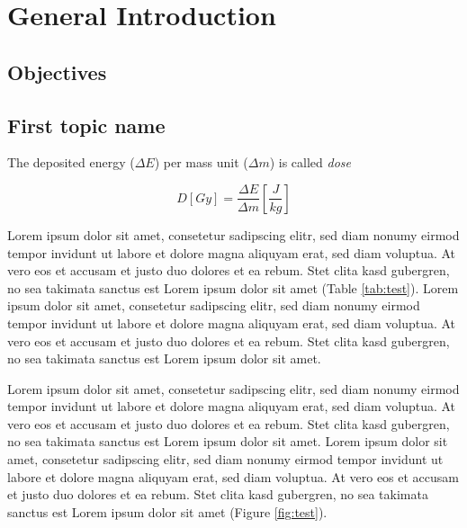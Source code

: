 \chapter{General Introduction} \label{introduction}
\setcounter{page}{1}

\section{Objectives}

\section{First topic name}

The deposited energy ($\Delta E$) per mass unit ($\Delta m$) is called \textit{dose}

\begin{equation}
D[Gy]=\frac{\Delta E}{\Delta m} \left [ \frac{J}{kg} \right]
\end{equation}

Lorem ipsum dolor sit amet, consetetur sadipscing elitr, sed diam nonumy eirmod tempor invidunt ut labore et dolore magna aliquyam erat, sed diam voluptua. At vero eos et accusam et justo duo dolores et ea rebum. Stet clita kasd gubergren, no sea takimata sanctus est Lorem ipsum dolor sit amet (Table \ref{tab:test}). Lorem ipsum dolor sit amet, consetetur sadipscing elitr, sed diam nonumy eirmod tempor invidunt ut labore et dolore magna aliquyam erat, sed diam voluptua. At vero eos et accusam et justo duo dolores et ea rebum. Stet clita kasd gubergren, no sea takimata sanctus est Lorem ipsum dolor sit amet.


Lorem ipsum dolor sit amet, consetetur sadipscing elitr, sed diam nonumy eirmod tempor invidunt ut labore et dolore magna aliquyam erat, sed diam voluptua. At vero eos et accusam et justo duo dolores et ea rebum. Stet clita kasd gubergren, no sea takimata sanctus est Lorem ipsum dolor sit amet. Lorem ipsum dolor sit amet, consetetur sadipscing elitr, sed diam nonumy eirmod tempor invidunt ut labore et dolore magna aliquyam erat, sed diam voluptua. At vero eos et accusam et justo duo dolores et ea rebum. Stet clita kasd gubergren, no sea takimata sanctus est Lorem ipsum dolor sit amet (Figure \ref{fig:test}).

